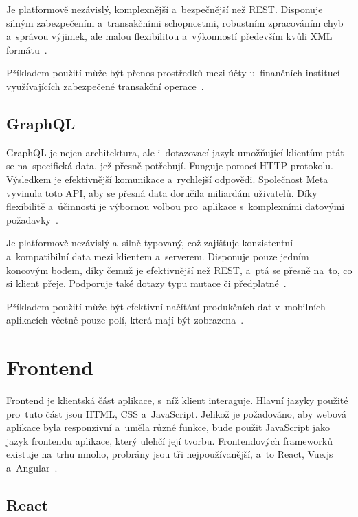 \documentclass[twoside]{ctuthesis}
\begin{document}
Je platformově nezávislý, komplexnější a~bezpečnější než REST. Disponuje silným zabezpečením a~transakčními schopnostmi, robustním zpracováním chyb a~správou výjimek, ale malou flexibilitou a~výkonností především kvůli XML formátu~\cite{dev}.

Příkladem použití může být přenos prostředků mezi účty u~finančních institucí využívajících zabezpečené transakční operace~\cite{milan}.

\newpage

\subsection{GraphQL}

GraphQL je nejen architektura, ale i~dotazovací jazyk umožňující klientům ptát se na~specifická data, jež přesně potřebují. Funguje pomocí HTTP protokolu. Výsledkem je efektivnější komunikace a~rychlejší odpovědi. Společnost Meta vyvinula toto API, aby se přesná data doručila miliardám uživatelů. Díky flexibilitě a~účinnosti je výbornou volbou pro~aplikace s~komplexními datovými požadavky~\cite{dev}. 

Je platformově nezávislý a~silně typovaný, což zajišťuje konzistentní a~kompatibilní data mezi klientem a~serverem. Disponuje pouze jedním koncovým bodem, díky čemuž je efektivnější než REST, a~ptá se přesně na~to, co si klient přeje. Podporuje také dotazy typu mutace či předplatné~\cite{dev}.

Příkladem použití může být efektivní načítání produkčních dat v~mobilních aplikacích včetně pouze polí, která mají být zobrazena~\cite{milan}.

\section{Frontend}

Frontend je klientská část aplikace, s~níž klient interaguje. Hlavní jazyky použité pro~tuto část jsou HTML, CSS a~JavaScript. Jelikož je požadováno, aby webová aplikace byla responzivní a~uměla různé funkce, bude použit JavaScript jako jazyk frontendu aplikace, který ulehčí její tvorbu. Frontendových frameworků existuje na~trhu mnoho, probrány jsou tři nejpoužívanější, a~to React, Vue.js a~Angular~\cite{frontend}.

\subsection{React}
\end{document}

